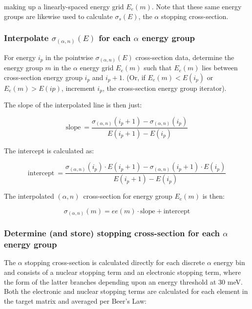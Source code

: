 \documentclass[10pt]{article}
\newcommand{\alphn}[0]{$\left(\alpha,n\right)$}
\newcommand{\sigan}[0]{\sigma_{\left(\alpha,n\right)}}
\begin{document}
making up a linearly-spaced energy grid $E_e\left(m\right)$. Note that these same energy groups are likewise used to calculate $\sigma_{s}\left(E\right)$, the $\alpha$ stopping cross-section. 

\subsubsection{Interpolate $\sigan\left(E\right)$ for each $\alpha$ energy group}

For energy $i_p$ in the pointwise $\sigan\left(E\right)$ cross-section data, determine the energy group $m$ in the $\alpha$ energy grid $E_e\left(m\right)$ such that $E_e\left(m\right)$ lies between cross-section energy group $i_p$ and $i_p+1$. (Or, if $E_e\left(m\right) < E\left(i_p\right)$ or $E_e\left(m\right) > E\left(ip\right)$, increment $i_p$, the cross-section energy group iterator). 

The slope of the interpolated line is then just:

\begin{equation}
\mathrm{slope}\ = \frac{ \sigan\left(i_p+1\right) - \sigan\left(i_p\right) }{ E\left(i_p+1\right) - E\left(i_p\right) }
\end{equation}

The intercept is calculated as:

\begin{equation}
\mathrm{intercept}\ = \frac{ \sigan\left(i_p \right) \cdot E\left(i_p+1\right) - \sigan\left(i_p+1\right) \cdot E\left(i_p\right) } { E\left(i_p+1\right) - E\left(i_p\right)}
\end{equation}

The interpolated \alphn\ cross-section for energy group $E_e\left(m\right)$ is then:

\begin{equation}
\sigan\left(m\right) = ee\left(m\right) \cdot \mathrm{slope} + \mathrm{intercept}
\end{equation}

\subsubsection{Determine (and store) stopping cross-section for each $\alpha$ energy group}

The $\alpha$ stopping cross-section is calculated directly for each discrete $\alpha$ energy bin and consists of a nuclear stopping term and an electronic stopping term, where the form of the latter branches depending upon an energy threshold at 30 meV. Both the electronic and nuclear stopping terms are calculated for each element in the target matrix and averaged per Beer's Law:
\end{document}
